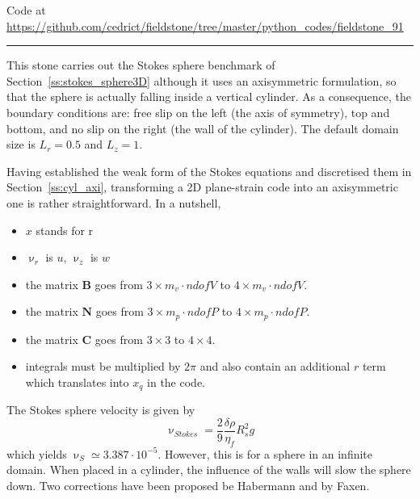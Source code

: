 

\begin{center}
Code at \url{https://github.com/cedrict/fieldstone/tree/master/python_codes/fieldstone_91}
\end{center}

\par\noindent\rule{\textwidth}{0.4pt}



This stone carries out the Stokes sphere benchmark of Section~\ref{ss:stokes_sphere3D} although 
it uses an axisymmetric formulation, so that the sphere is actually falling inside 
a vertical cylinder. As a consequence, the boundary conditions are: 
free slip on the left (the axis of symmetry), top and bottom, and no slip on the right (the
wall of the cylinder). The default domain size is $L_r=0.5$ and $L_z=1$.

Having established the weak form of the Stokes equations and discretised them in 
Section~\ref{ss:cyl_axi}, transforming a 2D plane-strain code into an axisymmetric one is rather straightforward.
In a nutshell, 
\begin{itemize}
\item $x$ stands for r
\item $\upnu_r$ is $u$, $\upnu_z$ is $w$
\item the matrix ${\bm B}$ goes from 
$3 \times m_v\cdot ndofV$ to $4 \times m_v\cdot ndofV$. 
\item the matrix ${\bm N}$ goes from $3 \times m_p\cdot ndofP$ to $4 \times m_p\cdot ndofP$. 
\item the matrix ${\bm C}$ goes from $3 \times 3$ to $4 \times 4$.
\item integrals must be multiplied by $2 \pi$ and also contain an additional $r$ term
which translates into $x_q$ in the code. 
\end{itemize}

The Stokes sphere velocity is given by
\[
\upnu_{Stokes} = \frac{2}{9} \frac{\delta \rho}{\eta_f} R_s^2 g
\]
which yields $\upnu_S\simeq 3.387 \cdot 10^{-5}$. However, 
this is for a sphere in an infinite domain. When placed in a 
cylinder, the influence of the walls will slow the sphere down. 
Two corrections have been proposed be Habermann and by Faxen.

